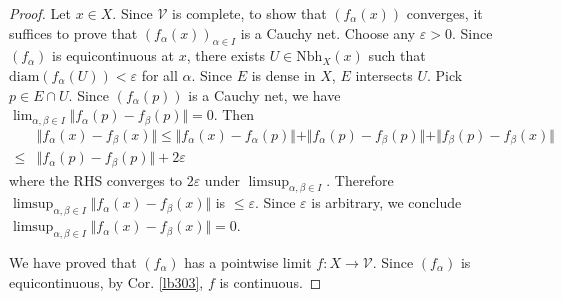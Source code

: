 \documentclass[12pt,b5paper,notitlepage]{article}
\theoremstyle{definition}
\theoremstyle{plain}
\newcommand{\mc}{\mathcal}
\newcommand{\Nbh}{\mathrm{Nbh}}
\newcommand{\diam}{\mathrm{diam}}
\newcommand{\eps}{\varepsilon}
\numberwithin{equation}{section}
\begin{document}
\begin{proof}
Let $x\in X$. Since $\mc V$ is complete, to show that $(f_\alpha(x))$ converges, it suffices to prove that $(f_\alpha(x))_{\alpha\in I}$ is a Cauchy net. Choose any $\eps>0$. Since $(f_\alpha)$ is equicontinuous at $x$, there exists $U\in\Nbh_X(x)$ such that $\diam(f_\alpha(U))<\eps$ for all $\alpha$. Since $E$ is dense in $X$, $E$ intersects $U$. Pick $p\in E\cap U$. Since $(f_\alpha(p))$ is a Cauchy net, we have $\lim_{\alpha,\beta\in I}\Vert f_\alpha(p)-f_\beta(p)\Vert=0$. Then
\begin{align*}
&\Vert f_\alpha(x)-f_\beta(x)\Vert\leq \Vert f_\alpha(x)-f_\alpha(p)\Vert+ \Vert f_\alpha(p)-f_\beta(p)\Vert+  \Vert f_\beta(p)-f_\beta(x)\Vert\\
\leq&\Vert f_\alpha(p)-f_\beta(p)\Vert+2\eps
\end{align*}
where the RHS converges to $2\eps$ under $\limsup_{\alpha,\beta\in I}$. Therefore $\limsup_{\alpha,\beta\in I}\Vert f_\alpha(x)-f_\beta(x)\Vert$ is $\leq\eps$. Since $\eps$ is arbitrary, we conclude $\limsup_{\alpha,\beta\in I}\Vert f_\alpha(x)-f_\beta(x)\Vert=0$.

We have proved that $(f_\alpha)$ has a pointwise limit $f:X\rightarrow\mc V$. Since $(f_\alpha)$ is equicontinuous, by Cor. \ref{lb303}, $f$ is continuous.
\end{proof}
\end{document}
